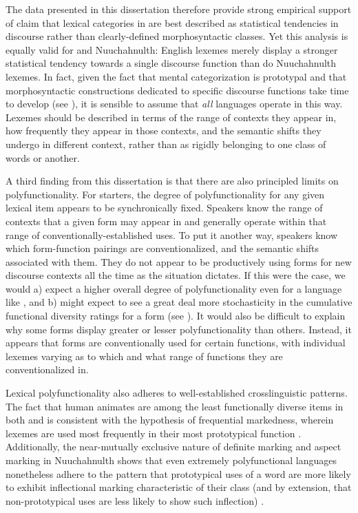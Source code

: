 The data presented in this dissertation therefore provide strong empirical support of  claim that lexical categories in  are best described as statistical tendencies in discourse rather than clearly-defined morphosyntactic classes. Yet this analysis is equally valid for  and Nuuchahnulth: English lexemes merely display a stronger statistical tendency towards a single discourse function than do Nuuchahnulth lexemes. In fact, given the fact that mental categorization is prototypal and that morphosyntactic constructions dedicated to specific discourse functions take time to develop (see ), it is sensible to assume that \emph{all} languages operate in this way. Lexemes should be described in terms of the range of contexts they appear in, how frequently they appear in those contexts, and the semantic shifts they undergo in different context, rather than as rigidly belonging to one class of words or another.

A third finding from this dissertation is that there are also principled limits on polyfunctionality. For starters, the degree of polyfunctionality for any given lexical item appears to be synchronically fixed. Speakers know the range of contexts that a given form may appear in and generally operate within that range of conventionally-established uses. To put it another way, speakers know which form-function pairings are conventionalized, and the semantic shifts associated with them. They do not appear to be productively using forms for new discourse contexts all the time as the situation dictates. If this were the case, we would a) expect a higher overall degree of polyfunctionality even for a language like , and b) might expect to see a great deal more stochasticity in the cumulative functional diversity ratings for a form (see ). It would also be difficult to explain why some forms display greater or lesser polyfunctionality than others. Instead, it appears that forms are conventionally used for certain functions, with individual lexemes varying as to which and what range of functions they are conventionalized in.

Lexical polyfunctionality also adheres to well-established crosslinguistic patterns. The fact that human animates are among the least functionally diverse items in both  and  is consistent with the hypothesis of frequential markedness, wherein lexemes are used most frequently in their most prototypical function \parencites{Croft1991}{Croft2000}{Croft2001b}{CroftLier2012}. Additionally, the near-mutually exclusive nature of definite marking and aspect marking in Nuuchahnulth shows that even extremely polyfunctional languages nonetheless adhere to the pattern that prototypical uses of a word are more likely to exhibit inflectional marking characteristic of their class (and by extension, that non-prototypical uses are less likely to show such inflection) \parencite{HopperThompson1984}.

